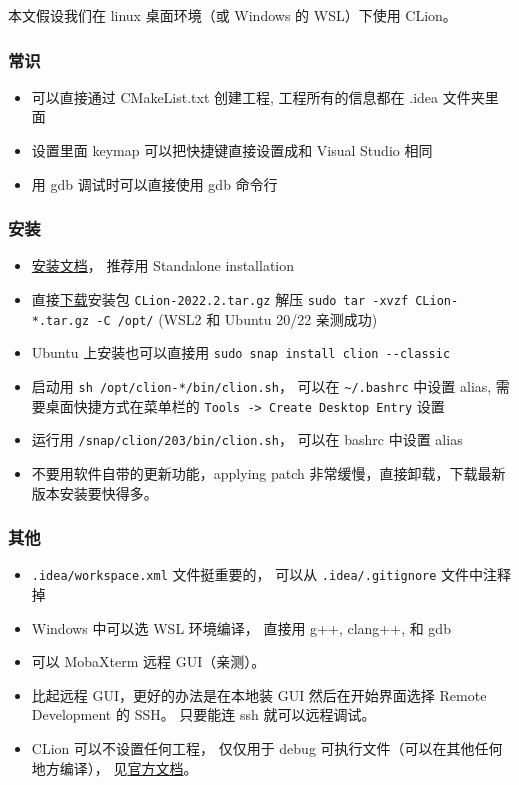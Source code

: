 
\begin{issues}
\issueDraft
\end{issues}

本文假设我们在 linux 桌面环境（或 Windows 的 WSL）下使用 CLion。

\subsubsection{常识}
\begin{itemize}
\item 可以直接通过 CMakeList.txt 创建工程, 工程所有的信息都在 .idea 文件夹里面
\item 设置里面 keymap 可以把快捷键直接设置成和 Visual Studio 相同
\item 用 gdb 调试时可以直接使用 gdb 命令行
\end{itemize}

\subsubsection{安装}
\begin{itemize}
\item \href{https://www.jetbrains.com/help/clion/installation-guide.html}{安装文档}， 推荐用 Standalone installation
\item 直接\href{https://www.jetbrains.com/clion/download/#section=linux}{下载}安装包 \verb`CLion-2022.2.tar.gz` 解压 \verb`sudo tar -xvzf CLion-*.tar.gz -C /opt/` (WSL2 和 Ubuntu 20/22 亲测成功)
\item Ubuntu 上安装也可以直接用 \verb`sudo snap install clion --classic`
\item  启动用 \verb`sh /opt/clion-*/bin/clion.sh`， 可以在 \verb|~/.bashrc| 中设置 alias, 需要桌面快捷方式在菜单栏的 \verb`Tools -> Create Desktop Entry` 设置
\item 运行用 \verb`/snap/clion/203/bin/clion.sh`， 可以在 bashrc 中设置 alias
\item 不要用软件自带的更新功能，applying patch 非常缓慢，直接卸载，下载最新版本安装要快得多。
\end{itemize}


\subsubsection{其他}
\begin{itemize}
\item \verb`.idea/workspace.xml` 文件挺重要的， 可以从 \verb`.idea/.gitignore` 文件中注释掉
\item Windows 中可以选 WSL 环境编译， 直接用 g++, clang++, 和 gdb
\item 可以 MobaXterm 远程 GUI（亲测）。
\item 比起远程 GUI，更好的办法是在本地装 GUI 然后在开始界面选择 Remote Development 的 SSH。 只要能连 ssh 就可以远程调试。


\item CLion 可以不设置任何工程， 仅仅用于 debug 可执行文件（可以在其他任何地方编译）， 见\href{https://www.jetbrains.com/help/clion/debug-arbitrary-executable.html}{官方文档}。
\end{itemize}

